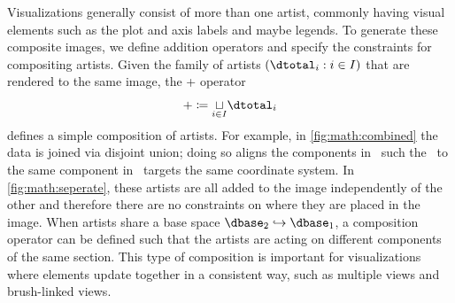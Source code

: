 \documentclass[../main.tex]{subfiles}
\begin{document}
Visualizations generally consist of more than one artist, commonly having visual elements such as the plot and axis labels and maybe legends. To generate these composite images, we define addition operators and specify the constraints for compositing artists. Given the family of artists $(\dtotal_i: i\in I)$ that are rendered to the same image, the + operator 
\begin{equation}
+ \coloneqq \underset{i\in I}{\sqcup} \dtotal_{i}
\end{equation}
defines a simple composition of artists. For example, in \autoref{fig:math:combined} the data is joined via disjoint union; doing so aligns the components in \dfiber\ such the \vchannel\ to the same component in \vfiber\ targets the same coordinate system. In \autoref{fig:math:seperate}, these artists are all added to the image independently of the other and therefore there are no constraints on where they are placed in the image. When artists share a base space $\dbase_2 \hookrightarrow \dbase_1$, a composition operator can be defined such that the artists are acting on different components of the same section. This type of composition is important for visualizations where elements update together in a consistent way, such as multiple views \cite{alboRadarComparativeEvaluation2016a, hullmanKeeping2018} and brush-linked views\cite{beckerBrushingScatterplots1987,bujaInteractiveData1991}.
\end{document}
